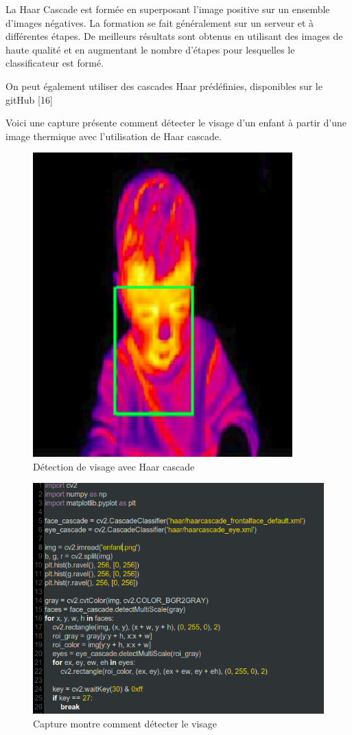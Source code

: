 \documentclass[12pt]{article}
\begin{document}
La Haar Cascade est formée en superposant l'image positive sur un ensemble d'images négatives. La formation se fait généralement sur un serveur et à différentes étapes. De meilleurs résultats sont obtenus en utilisant des images de haute qualité et en augmentant le nombre d'étapes pour lesquelles le classificateur est formé.

On peut également utiliser des cascades Haar prédéfinies, disponibles sur le gitHub [16]

Voici une capture présente comment détecter le visage d'un enfant à partir d'une image thermique avec l'utilisation de Haar cascade.

\newpage
\begin{figure}[h]
	\centering
	\includegraphics[width=10cm]{img-Chapiter-3/enfant.png}
	\caption{Détection de visage avec Haar cascade}
\end{figure}
\newpage
\begin{figure}[h]
	\centering
	\includegraphics[width=15cm]{img-Chapiter-4/detection.png}
	\caption{Capture montre comment  détecter le visage}
\end{figure}
\end{document}
